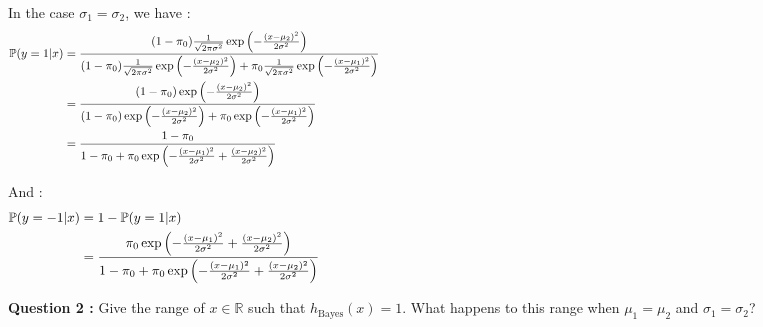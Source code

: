 \documentclass[12pt,a4paper]{article}
\begin{document}
\noindent In the case $\sigma_1 = \sigma_2$, we have :
\begin{align*}
    \mathbb{P}(y = 1 | x) &= \frac{(1 - \pi_0)\frac{1}{\sqrt{2\pi\sigma^2}} \exp\left( -\frac{(x - \mu_2)^2}{2\sigma^2} \right)}{(1 - \pi_0)\frac{1}{\sqrt{2\pi\sigma^2}} \exp\left( -\frac{(x - \mu_2)^2}{2\sigma^2} \right) + \pi_0\frac{1}{\sqrt{2\pi\sigma^2}} \exp\left( -\frac{(x - \mu_1)^2}{2\sigma^2} \right)} \hspace{14.5cm} \\
    &= \frac{(1 - \pi_0)\exp\left( -\frac{(x - \mu_2)^2}{2\sigma^2} \right)}{(1 - \pi_0)\exp\left( -\frac{(x - \mu_2)^2}{2\sigma^2} \right) + \pi_0\exp\left( -\frac{(x - \mu_1)^2}{2\sigma^2} \right)} \\
    &= \frac{1 - \pi_0}{1 - \pi_0 + \pi_0\exp\left( -\frac{(x - \mu_1)^2}{2\sigma^2} + \frac{(x - \mu_2)^2}{2\sigma^2} \right)} \\
\end{align*}

\noindent And :
\begin{align*}
    \mathbb{P}(y = -1 | x) &= 1 - \mathbb{P}(y = 1 | x) \\
    &= \frac{\pi_0\exp\left( -\frac{(x - \mu_1)^2}{2\sigma^2} + \frac{(x - \mu_2)^2}{2\sigma^2} \right)}{1 - \pi_0 + \pi_0\exp\left( -\frac{(x - \mu_1)^2}{2\sigma^2} + \frac{(x - \mu_2)^2}{2\sigma^2} \right)} \hspace{14.5cm} \\
\end{align*}




\color{black}


\noindent\textbf{Question 2 :} Give the range of $x \in \mathbb{R}$ such that $h_{\text{Bayes}}(x) = 1$. What happens to this range when $\mu_1 = \mu_2$ and $\sigma_1 = \sigma_2$? \\
\end{document}
